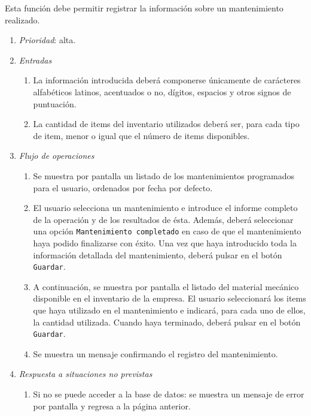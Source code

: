 	Esta función debe permitir registrar la información sobre un mantenimiento realizado.

\begin{enumerate}
	\item \textit{Prioridad}: alta.
	\item \textit{Entradas}
	\begin{enumerate}
		\item La información introducida deberá componerse únicamente de carácteres alfabéticos latinos, acentuados o no, dígitos, espacios y otros signos de puntuación.
		\item La cantidad de items del inventario utilizados deberá ser, para cada tipo de item, menor o igual que el número de items disponibles.
	\end{enumerate}
	\item \textit{Flujo de operaciones}
	\begin{enumerate}
		\item Se muestra por pantalla un listado de los mantenimientos programados para el usuario, ordenados por fecha por defecto.
		\item El usuario selecciona un mantenimiento e introduce el informe completo de la operación y de los resultados de ésta. Además, deberá seleccionar una opción \verb|Mantenimiento completado| en caso de que el mantenimiento haya podido finalizarse con éxito. Una vez que haya introducido toda la información detallada del mantenimiento, deberá pulsar en el botón \verb|Guardar|.
		\item A continuación, se muestra por pantalla el listado del material mecánico disponible en el inventario de la empresa. El usuario seleccionará los items que haya utilizado en el mantenimiento e indicará, para cada uno de ellos, la cantidad utilizada. Cuando haya terminado, deberá pulsar en el botón \verb|Guardar|.
		\item Se muestra un mensaje confirmando el registro del mantenimiento.
	\end{enumerate}
	\item \textit{Respuesta a situaciones no previstas}
	\begin{enumerate}
		\item Si no se puede acceder a la base de datos: se muestra un mensaje de error por pantalla y regresa a la página anterior.
	\end{enumerate}

\end{enumerate}
